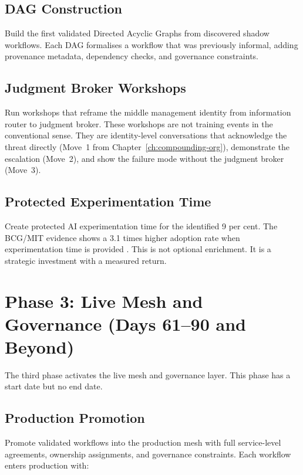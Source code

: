 \subsection{DAG Construction}

Build the first validated Directed Acyclic Graphs from discovered shadow workflows. Each DAG formalises a workflow that was previously informal, adding provenance metadata, dependency checks, and governance constraints.

\subsection{Judgment Broker Workshops}

Run workshops that reframe the middle management identity from information router to judgment broker. These workshops are not training events in the conventional sense. They are identity-level conversations that acknowledge the threat directly (Move~1 from Chapter~\ref{ch:compounding-org}), demonstrate the escalation (Move~2), and show the failure mode without the judgment broker (Move~3).

\subsection{Protected Experimentation Time}

Create protected AI experimentation time for the identified 9 per cent. The BCG/MIT evidence shows a 3.1 times higher adoption rate when experimentation time is provided \parencite{BCGAIKPIs2025}. This is not optional enrichment. It is a strategic investment with a measured return.

\section{Phase 3: Live Mesh and Governance (Days 61--90 and Beyond)}

The third phase activates the live mesh and governance layer. This phase has a start date but no end date.

\subsection{Production Promotion}

Promote validated workflows into the production mesh with full service-level agreements, ownership assignments, and governance constraints. Each workflow enters production with:

